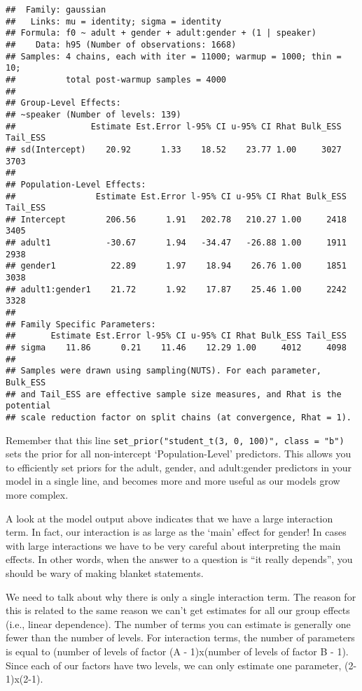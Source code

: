 \documentclass[
]{book}
\begin{document}
\begin{verbatim}
##  Family: gaussian 
##   Links: mu = identity; sigma = identity 
## Formula: f0 ~ adult + gender + adult:gender + (1 | speaker) 
##    Data: h95 (Number of observations: 1668) 
## Samples: 4 chains, each with iter = 11000; warmup = 1000; thin = 10;
##          total post-warmup samples = 4000
## 
## Group-Level Effects: 
## ~speaker (Number of levels: 139) 
##               Estimate Est.Error l-95% CI u-95% CI Rhat Bulk_ESS Tail_ESS
## sd(Intercept)    20.92      1.33    18.52    23.77 1.00     3027     3703
## 
## Population-Level Effects: 
##                Estimate Est.Error l-95% CI u-95% CI Rhat Bulk_ESS Tail_ESS
## Intercept        206.56      1.91   202.78   210.27 1.00     2418     3405
## adult1           -30.67      1.94   -34.47   -26.88 1.00     1911     2938
## gender1           22.89      1.97    18.94    26.76 1.00     1851     3038
## adult1:gender1    21.72      1.92    17.87    25.46 1.00     2242     3328
## 
## Family Specific Parameters: 
##       Estimate Est.Error l-95% CI u-95% CI Rhat Bulk_ESS Tail_ESS
## sigma    11.86      0.21    11.46    12.29 1.00     4012     4098
## 
## Samples were drawn using sampling(NUTS). For each parameter, Bulk_ESS
## and Tail_ESS are effective sample size measures, and Rhat is the potential
## scale reduction factor on split chains (at convergence, Rhat = 1).
\end{verbatim}

Remember that this line \texttt{set\_prior("student\_t(3,\ 0,\ 100)",\ class\ =\ "b")} sets the prior for all non-intercept `Population-Level' predictors. This allows you to efficiently set priors for the adult, gender, and adult:gender predictors in your model in a single line, and becomes more and more useful as our models grow more complex.

A look at the model output above indicates that we have a large interaction term. In fact, our interaction is as large as the `main' effect for gender! In cases with large interactions we have to be very careful about interpreting the main effects. In other words, when the answer to a question is ``it really depends'', you should be wary of making blanket statements.

We need to talk about why there is only a single interaction term. The reason for this is related to the same reason we can't get estimates for all our group effects (i.e., linear dependence). The number of terms you can estimate is generally one fewer than the number of levels. For interaction terms, the number of parameters is equal to (number of levels of factor (A - 1)x(number of levels of factor B - 1). Since each of our factors have two levels, we can only estimate one parameter, (2-1)x(2-1).
\end{document}
